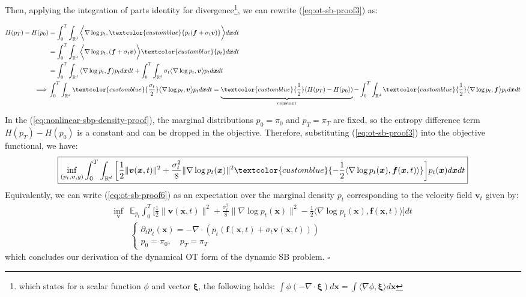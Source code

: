 \documentclass{article}
\newcommand{\bluetext}[1]{\textcolor{customblue}{#1}}
\begin{document}
Then, applying the integration of parts identity for divergence\footnote{which states for a scalar function $\phi$ and vector $\boldsymbol{\xi}$, the following holds: $\int\phi(-\nabla\cdot \boldsymbol{\xi})d\boldsymbol{x}=\int\langle\nabla\phi,\boldsymbol{\xi}\rangle d\boldsymbol{x}$}, we can rewrite (\ref{eq:ot-sb-proof3}) as:
\begin{small}
\begin{align}
    H(p_T)-H(p_0)&=\int_0^T\int_{\mathbb{R}^d}\bigg\langle\nabla\log p_t,\bluetext{p_t(\boldsymbol{f}+\sigma_t\boldsymbol{v})}\bigg\rangle d\boldsymbol{x}dt\nonumber\\
    &=\int_0^T\int_{\mathbb{R}^d}\bigg\langle\nabla\log p_t,(\boldsymbol{f}+\sigma_t\boldsymbol{v})\bigg\rangle \bluetext{p_t}d\boldsymbol{x}dt\nonumber\\
    &=\int_0^T\int_{\mathbb{R}^d}\big\langle\nabla\log p_t,\boldsymbol{f}\big\rangle p_td\boldsymbol{x}dt+\int_0^T\int_{\mathbb{R}^d}\sigma_t\big\langle\nabla\log p_t,\boldsymbol{v}\big\rangle p_td\boldsymbol{x}dt\nonumber\\
    \implies & \int_0^T\int_{\mathbb{R}^d}\bluetext{\frac{\sigma_t}{2}}\big\langle\nabla\log p_t,\boldsymbol{v}\big\rangle p_td\boldsymbol{x}dt=\underbrace{\bluetext{\frac{1}{2}}(H(p_T)-H(p_0))}_{\text{constant}} -\int_0^T\int_{\mathbb{R}^d}\bluetext{\frac{1}{2}}\big\langle\nabla\log p_t,\boldsymbol{f}\big\rangle p_t d\boldsymbol{x}dt\label{eq:ot-sb-proof4}
\end{align}
\end{small}
In the (\ref{eq:nonlinear-sbp-density-proof}), the marginal distributions $p_0=\pi_0$ and $p_T=\pi_T$ are fixed, so the entropy difference term $H(p_T)-H(p_0)$ is a constant and can be dropped in the objective. Therefore, substituting (\ref{eq:ot-sb-proof3}) into the objective functional, we have:
\begin{align}
    \boxed{\inf_{(p_t, \boldsymbol{v}, g)}\int_0^T\int_{\mathbb{R}^d}\bigg[\frac{1}{2}\|\boldsymbol{v}(\boldsymbol{x},t)\|^2+\frac{\sigma^2_t}{8}\|\nabla \log p_t(\boldsymbol{x})\|^2\bluetext{-\frac{1}{2}\langle\nabla \log p_t(\boldsymbol{x}), \boldsymbol{f}(\boldsymbol{x},t)\rangle}\bigg]p_t(\boldsymbol{x})d\boldsymbol{x}dt}\label{eq:ot-sb-proof6}
\end{align}
Equivalently, we can write (\ref{eq:ot-sb-proof6}) as an expectation over the marginal density $p_t$ corresponding to the velocity field $\boldsymbol{v}_t$ given by:
\begin{align}
    \inf_{\boldsymbol{v}}&\mathbb{E}_{p_t}\int_0^T\bigg[\frac{1}{2}\|\boldsymbol{v}(\boldsymbol{x},t)\|^2+\frac{\sigma^2_t}{8}\|\nabla \log p_t(\boldsymbol{x})\|^2-\frac{1}{2}\langle\nabla \log p_t(\boldsymbol{x}), \boldsymbol{f}(\boldsymbol{x},t)\rangle\bigg]dt\\
    &\begin{cases}
        \partial_tp_t(\boldsymbol{x})=-\nabla \cdot (p_t(\boldsymbol{f}(\boldsymbol{x},t)+\sigma_t\boldsymbol{v}(\boldsymbol{x},t)))\\
        p_0=\pi_0, \quad p_T=\pi_T
    \end{cases}
\end{align}
which concludes our derivation of the dynamical OT form of the dynamic SB problem. \hfill $\square$
\end{document}
